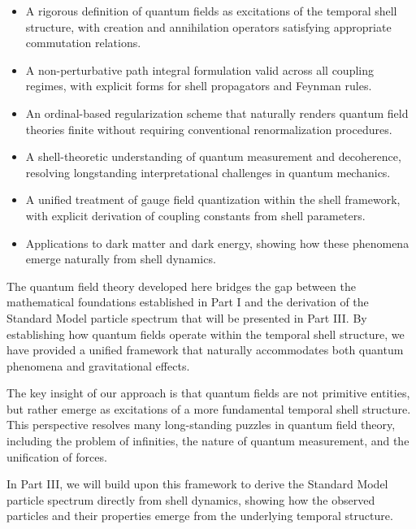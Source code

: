 \documentclass[12pt,a4paper]{article}
\begin{document}
\begin{itemize}
    \item A rigorous definition of quantum fields as excitations of the temporal shell structure, with creation and annihilation operators satisfying appropriate commutation relations.
    
    \item A non-perturbative path integral formulation valid across all coupling regimes, with explicit forms for shell propagators and Feynman rules.
    
    \item An ordinal-based regularization scheme that naturally renders quantum field theories finite without requiring conventional renormalization procedures.
    
    \item A shell-theoretic understanding of quantum measurement and decoherence, resolving longstanding interpretational challenges in quantum mechanics.
    
    \item A unified treatment of gauge field quantization within the shell framework, with explicit derivation of coupling constants from shell parameters.
    
    \item Applications to dark matter and dark energy, showing how these phenomena emerge naturally from shell dynamics.
\end{itemize}

The quantum field theory developed here bridges the gap between the mathematical foundations established in Part I and the derivation of the Standard Model particle spectrum that will be presented in Part III. By establishing how quantum fields operate within the temporal shell structure, we have provided a unified framework that naturally accommodates both quantum phenomena and gravitational effects.

The key insight of our approach is that quantum fields are not primitive entities, but rather emerge as excitations of a more fundamental temporal shell structure. This perspective resolves many long-standing puzzles in quantum field theory, including the problem of infinities, the nature of quantum measurement, and the unification of forces.

In Part III, we will build upon this framework to derive the Standard Model particle spectrum directly from shell dynamics, showing how the observed particles and their properties emerge from the underlying temporal structure.



\end{document}
